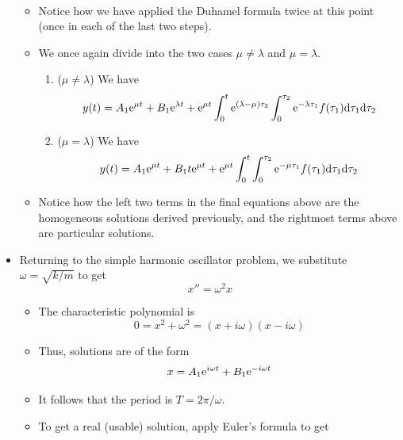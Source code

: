 \documentclass[../notes.tex]{subfiles}
\begin{document}
\begin{itemize}
\begin{itemize}
\begin{align*}
        \end{align*}
        \item Notice how we have applied the Duhamel formula twice at this point (once in each of the last two steps).
        \item We once again divide into the two cases $\mu\neq\lambda$ and $\mu=\lambda$.
        \begin{enumerate}
            \item ($\mu\neq\lambda$) We have
            \begin{equation*}
                y(t) = A_1\e[\mu t]+B_1\e[\lambda t]+\e[\mu t]\int_0^t\e[(\lambda-\mu)\tau_2]\int_0^{\tau_2}\e[-\lambda\tau_1]f(\tau_1)\dd\tau_1\dd\tau_2
            \end{equation*}
            \item ($\mu=\lambda$) We have
            \begin{equation*}
                y(t) = A_1\e[\mu t]+B_1t\e[\mu t]+\e[\mu t]\int_0^t\int_0^{\tau_2}\e[-\mu\tau_1]f(\tau_1)\dd\tau_1\dd\tau_2
            \end{equation*}
        \end{enumerate}
        \item Notice how the left two terms in the final equations above are the homogeneous solutions derived previously, and the rightmost terms above are particular solutions.
    \end{itemize}
    \item Returning to the simple harmonic oscillator problem, we substitute $\omega=\sqrt{k/m}$ to get
    \begin{equation*}
        x'' = \omega^2x
    \end{equation*}
    \begin{itemize}
        \item The characteristic polynomial is
        \begin{equation*}
            0 = x^2+\omega^2
            = (x+i\omega)(x-i\omega)
        \end{equation*}
        \item Thus, solutions are of the form
        \begin{equation*}
            x = A_1\e[i\omega t]+B_1\e[-i\omega t]
        \end{equation*}
        \item It follows that the period is $T=2\pi/\omega$.
        \item To get a real (usable) solution, apply Euler's formula to get
        \begin{align*}

\end{align*}
\end{itemize}
\end{itemize}
\end{document}
